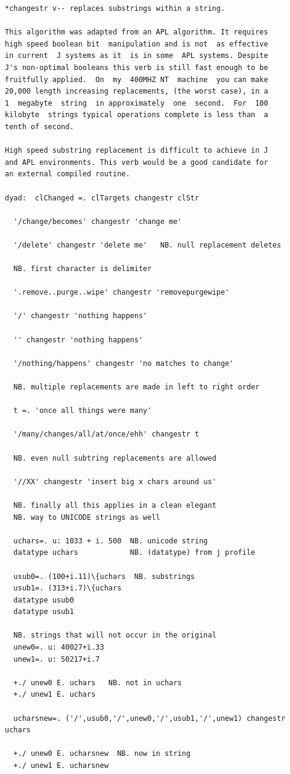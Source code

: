 \documentclass[11pt,letter,landscape]{article}
\begin{document}
    \begin{Verbatim}[commandchars=\\\{\}]
*changestr v-- replaces substrings within a string.

This algorithm was adapted from an APL algorithm. It requires
high speed boolean bit  manipulation and is not  as effective
in current  J systems as it  is in some  APL systems. Despite
J's non-optimal booleans this verb is still fast enough to be
fruitfully applied.  On  my  400MHZ NT  machine  you can make
20,000 length increasing replacements, (the worst case), in a
1  megabyte  string  in approximately  one  second.  For  100
kilobyte  strings typical operations complete is less than  a
tenth of second.

High speed substring replacement is difficult to achieve in J
and APL environments. This verb would be a good candidate for
an external compiled routine.

dyad:  clChanged =. clTargets changestr clStr

  '/change/becomes' changestr 'change me'

  '/delete' changestr 'delete me'   NB. null replacement deletes

  NB. first character is delimiter

  '.remove..purge..wipe' changestr 'removepurgewipe'

  '/' changestr 'nothing happens'

  '' changestr 'nothing happens'

  '/nothing/happens' changestr 'no matches to change'

  NB. multiple replacements are made in left to right order

  t =. 'once all things were many'

  '/many/changes/all/at/once/ehh' changestr t

  NB. even null subtring replacements are allowed

  '//XX' changestr 'insert big x chars around us'

  NB. finally all this applies in a clean elegant
  NB. way to UNICODE strings as well

  uchars=. u: 1033 + i. 500  NB. unicode string
  datatype uchars            NB. (datatype) from j profile

  usub0=. (100+i.11)\{uchars  NB. substrings
  usub1=. (313+i.7)\{uchars
  datatype usub0
  datatype usub1

  NB. strings that will not occur in the original
  unew0=. u: 40027+i.33
  unew1=. u: 50217+i.7

  +./ unew0 E. uchars   NB. not in uchars
  +./ unew1 E. uchars

  ucharsnew=. ('/',usub0,'/',unew0,'/',usub1,'/',unew1) changestr uchars

  +./ unew0 E. ucharsnew  NB. now in string
  +./ unew1 E. ucharsnew



    \end{Verbatim}
\end{document}
